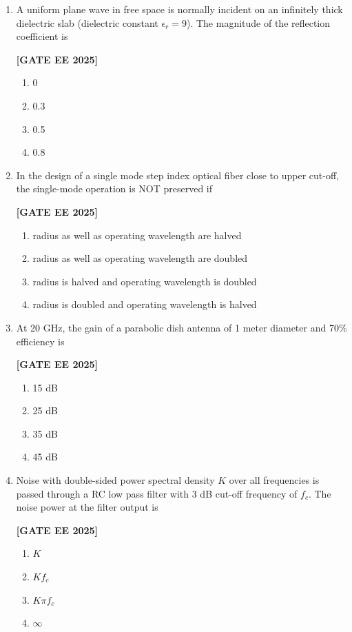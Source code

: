 \documentclass[12pt]{article}
\begin{document}
\begin{enumerate}[leftmargin=*, label=\textbf{Q.\arabic*:}]
\item A uniform plane wave in free space is normally incident on an infinitely thick dielectric slab (dielectric constant $\epsilon_r = 9$). The magnitude of the reflection coefficient is
 
\noindent \textbf{[GATE EE 2025]}
\begin{enumerate}
  \item 0
  \item 0.3
  \item 0.5
  \item 0.8
\end{enumerate}

\item In the design of a single mode step index optical fiber close to upper cut-off, the single-mode operation is NOT preserved if
 
\noindent \textbf{[GATE EE 2025]}
\begin{enumerate}
  \item radius as well as operating wavelength are halved
  \item radius as well as operating wavelength are doubled
  \item radius is halved and operating wavelength is doubled
  \item radius is doubled and operating wavelength is halved
\end{enumerate}

\item At 20 GHz, the gain of a parabolic dish antenna of 1 meter diameter and 70\% efficiency is
 
\noindent \textbf{[GATE EE 2025]}
\begin{enumerate}
  \item 15 dB
  \item 25 dB
  \item 35 dB
  \item 45 dB
\end{enumerate}

\item Noise with double-sided power spectral density $K$ over all frequencies is passed through a RC low pass filter with 3 dB cut-off frequency of $f_c$. The noise power at the filter output is
 
\noindent \textbf{[GATE EE 2025]}
\begin{enumerate}
  \item $K$
  \item $K f_c$
  \item $K \pi f_c$
  \item $\infty$
\end{enumerate}


\end{enumerate}
\end{document}
